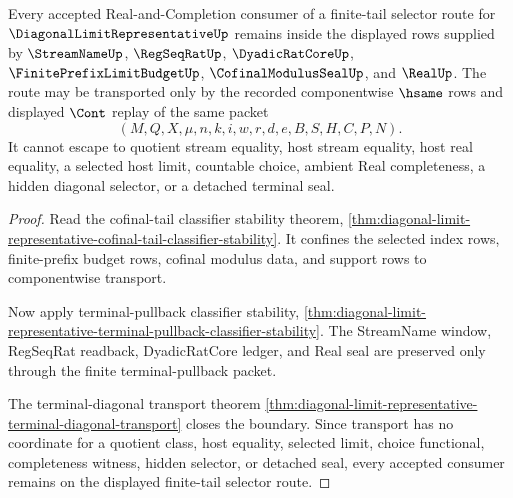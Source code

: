\begin{theorem}
\label{thm:diagonal-limit-representative-finite-tail-selector-nonescape}
Every accepted Real-and-Completion consumer of a finite-tail selector route for $\DiagonalLimitRepresentativeUp$ remains inside the displayed rows supplied by $\StreamNameUp$, $\RegSeqRatUp$, $\DyadicRatCoreUp$, $\FinitePrefixLimitBudgetUp$, $\CofinalModulusSealUp$, and $\RealUp$. The route may be transported only by the recorded componentwise $\hsame$ rows and displayed $\Cont$ replay of the same packet
$$
(M,Q,X,\mu,n,k,i,w,r,d,e,B,S,H,C,P,N).
$$
It cannot escape to quotient stream equality, host stream equality, host real equality, a selected host limit, countable choice, ambient Real completeness, a hidden diagonal selector, or a detached terminal seal.
\end{theorem}
\begin{proof}
Read the cofinal-tail classifier stability theorem, \autoref{thm:diagonal-limit-representative-cofinal-tail-classifier-stability}. It confines the selected index rows, finite-prefix budget rows, cofinal modulus data, and support rows to componentwise transport.

Now apply terminal-pullback classifier stability, \autoref{thm:diagonal-limit-representative-terminal-pullback-classifier-stability}. The StreamName window, RegSeqRat readback, DyadicRatCore ledger, and Real seal are preserved only through the finite terminal-pullback packet.

The terminal-diagonal transport theorem \autoref{thm:diagonal-limit-representative-terminal-diagonal-transport} closes the boundary. Since transport has no coordinate for a quotient class, host equality, selected limit, choice functional, completeness witness, hidden selector, or detached seal, every accepted consumer remains on the displayed finite-tail selector route.
\end{proof}

